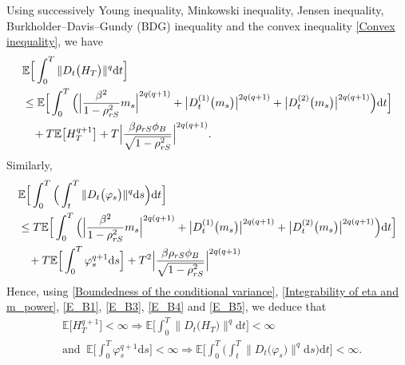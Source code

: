 \documentclass[12,reqno]{amsart}
\numberwithin{equation}{section}
\begin{document}
Using successively Young inequality, Minkowski inequality, Jensen inequality, \\Burkholder–Davis–Gundy (BDG) inequality and the convex inequality \eqref{Convex inequality}, we have
\begin{align}\label{Integrability of Malliavin derivatives_H_T}
	&\mathbb{E}\Big[\int_{0}^{T}\|D_{t}\big(H_{T}\big)\|^{q}\mathrm{d}t\Big]\notag\\
	&\le\mathbb{E}\Big[\int_{0}^{T}\Big(\Big|\frac{\beta^{2}}{1-\rho_{rS}^{2}}m_{s}\Big|^{2q(q+1)}+\big|D_{t}^{(1)}\big(m_{s}\big)\big|^{2q(q+1)}+\big|D_{t}^{(2)}\big(m_{s}\big)\big|^{2q(q+1)}\Big)\mathrm{d}t\Big]\notag\\
	&\phantom{X}+T\mathbb{E}\big[H_{T}^{q+1}\big]+T\Big|\frac{\beta\rho_{rS}\phi_{B}}{\sqrt{1-\rho_{rS}^{2}}}\Big|^{2q(q+1)}.
\end{align}
Similarly,
\begin{align}\label{Integrability of Malliavin derivatives_varphi_power}
	&\mathbb{E}\Big[\int_{0}^{T}\Big(\int_{t}^{T}\|D_{t}\big(\varphi_{s}\big)\|^{q}\mathrm{d}s\Big)\mathrm{d}t\Big]\notag\\
	&\le T\mathbb{E}\Big[\int_{0}^{T}\Big(\Big|\frac{\beta^{2}}{1-\rho_{rS}^{2}}m_{s}\Big|^{2q(q+1)}+\big|D_{t}^{(1)}\big(m_{s}\big)\big|^{2q(q+1)}+\big|D_{t}^{(2)}\big(m_{s}\big)\big|^{2q(q+1)}\Big)\mathrm{d}t\Big]\notag\\
	&\phantom{X}+T\mathbb{E}\Big[\int_{0}^{T}\varphi_{s}^{q+1}\mathrm{d}s\Big]+T^{2}\Big|\frac{\beta\rho_{rS}\phi_{B}}{\sqrt{1-\rho_{rS}^{2}}}\Big|^{2q(q+1)}
\end{align}
Hence, using \eqref{Boundedness of the conditional variance}, \eqref{Integrability of eta and m_power}, \eqref{E_B1}, \eqref{E_B3}, \eqref{E_B4} and \eqref{E_B5}, we deduce that
\begin{align}
	&\mathbb{E}\big[H_{T}^{q+1}\big]<\infty\Longrightarrow\mathbb{E}\Big[\int_{0}^{T}\|D_{t}\big(H_{T}\big)\|^{q}\mathrm{d}t\Big]<\infty\label{Finiteness of the Malliavin derivative of H_T}\\
	&\text{and }~\mathbb{E}\Big[\int_{0}^{T}\varphi_{s}^{q+1}\mathrm{d}s\Big]<\infty\Longrightarrow\mathbb{E}\Big[\int_{0}^{T}\Big(\int_{t}^{T}\|D_{t}\big(\varphi_{s}\big)\|^{q}\mathrm{d}s\Big)\mathrm{d}t\Big]<\infty.\label{Finiteness of the Malliavin derivative of varphi}
\end{align}
\end{document}
